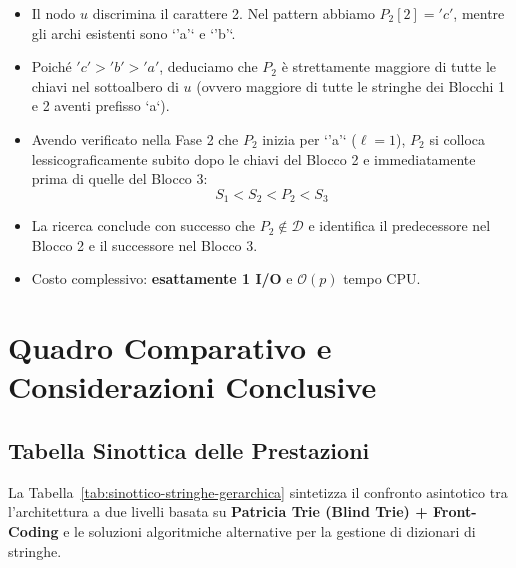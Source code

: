\begin{enumerate}
\begin{itemize}
    \item Il nodo $u$ discrimina il carattere 2. Nel pattern abbiamo $P_2[2] = 'c'$, mentre gli archi esistenti sono `'a'` e `'b'`.
    \item Poich\'e $'c' > 'b' > 'a'$, deduciamo che $P_2$ \`e strettamente maggiore di tutte le chiavi nel sottoalbero di $u$ (ovvero maggiore di tutte le stringhe dei Blocchi 1 e 2 aventi prefisso `a`).
    \item Avendo verificato nella Fase 2 che $P_2$ inizia per `'a'` ($\ell = 1$), $P_2$ si colloca lessicograficamente subito dopo le chiavi del Blocco 2 e immediatamente prima di quelle del Blocco 3:
    \begin{equation}
      S_1 < S_2 < P_2 < S_3
    \end{equation}
    \item La ricerca conclude con successo che $P_2 \notin \mathcal{D}$ e identifica il predecessore nel Blocco 2 e il successore nel Blocco 3.
    \item Costo complessivo: \textbf{esattamente 1 I/O} e $\mathcal{O}(p)$ tempo CPU.
  \end{itemize}
\end{enumerate}

\FloatBarrier
\section{Quadro Comparativo e Considerazioni Conclusive}
\label{sec:quadro-comparativo-stringhe-gerarchica}

\FloatBarrier
\subsection{Tabella Sinottica delle Prestazioni}
\label{subsec:tabella-sinottica-prestazioni}

La Tabella~\ref{tab:sinottico-stringhe-gerarchica} sintetizza il confronto asintotico tra l'architettura a due livelli basata su \textbf{Patricia Trie (Blind Trie) + Front-Coding} e le soluzioni algoritmiche alternative per la gestione di dizionari di stringhe.

